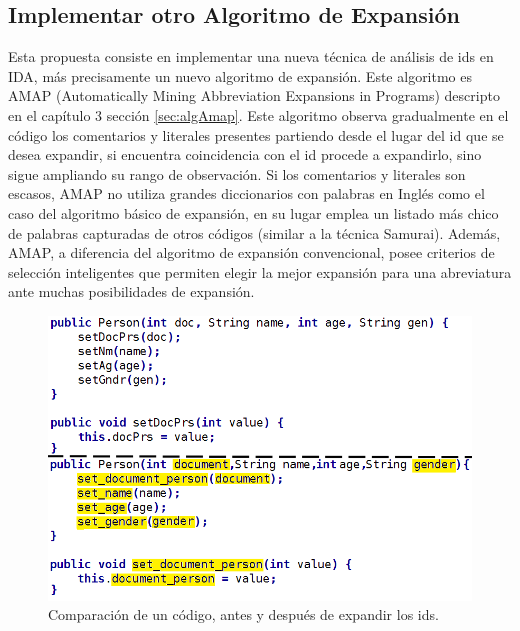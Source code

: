  
\subsection{Implementar otro Algoritmo de Expansión}

Esta propuesta consiste en implementar una nueva técnica de análisis de ids en IDA, más precisamente un nuevo algoritmo de expansión. Este algoritmo es AMAP (Automatically Mining Abbreviation Expansions in Programs) descripto en el capítulo 3 sección \ref{sec:algAmap}. Este algoritmo observa gradualmente en el código los comentarios y literales presentes partiendo desde el lugar del id que se desea expandir, si encuentra coincidencia con el id procede a expandirlo, sino sigue ampliando su rango de observación. Si los comentarios y literales son escasos, AMAP no utiliza grandes diccionarios con palabras en Inglés como el caso del algoritmo básico de expansión, en su lugar emplea un listado más chico de palabras capturadas de otros códigos (similar a la técnica Samurai).
Además, AMAP, a diferencia del algoritmo de expansión convencional, posee criterios de selección inteligentes que permiten elegir la mejor expansión para una abreviatura ante muchas posibilidades de expansión.

\begin{figure}[t] %
\centerline{%
\includegraphics[scale= 0.52]{./cap5/cod.png}
}
\caption{Comparación de un código, antes y después de expandir los ids.}
\label{cod}
\end{figure}

